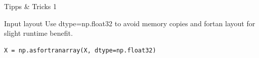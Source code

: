 \documentclass[a4paper,presentation]{beamer}
\begin{document}
\begin{frame}[fragile]{Tipps \& Tricks 1}
  \begin{block}{Input layout}
     {\footnotesize Use dtype=np.float32 to avoid memory copies and fortan layout for slight runtime benefit.}
     \begin{verbatim}
X = np.asfortranarray(X, dtype=np.float32)
     \end{verbatim}


  \end{block}
\end{frame}
\end{document}

